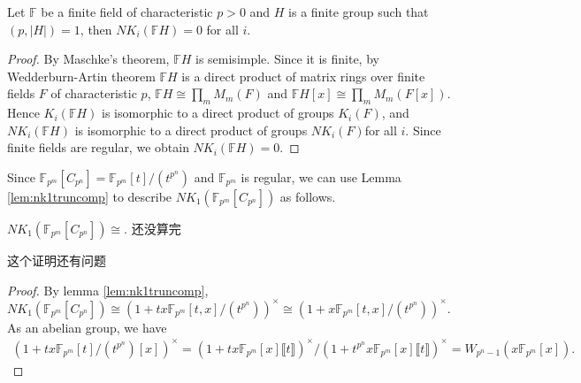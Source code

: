 \begin{theorem}
	Let $\mathbb{F}$ be a finite field of characteristic $p>0$ and $H$ is a finite group such that $(p, |H|)=1$, then $NK_i(\mathbb{F}H)=0$  for all $i$.
\end{theorem}
\begin{proof}
	By Maschke's theorem, $\mathbb{F}H$ is semisimple. Since it is finite, by Wedderburn-Artin theorem $\mathbb{F}H$ is a direct product of matrix rings over finite fields $F$ of characteristic $p$, $\mathbb{F}H \cong \prod_m M_m(F)$ and 
	$\mathbb{F}H[x] \cong \prod_m M_m(F[x])$. Hence $K_i(\mathbb{F}H)$ is isomorphic to a direct product of groups $K_i(F)$, and $NK_i(\mathbb{F}H)$ is isomorphic to a direct product of groups $NK_i(F)$for all $i$. Since finite fields are regular, we obtain $NK_i(\mathbb{F}H)=0$.
\end{proof}




Since $\mathbb{F}_{p^m}[C_{p^n}]=\mathbb{F}_{p^m}[t]/(t^{p^n})$ and $\mathbb{F}_{p^m}$ is regular, we can use Lemma \ref{lem:nk1truncomp} to describe $NK_1(\mathbb{F}_{p^m}[C_{p^n}])$ as follows.
\begin{theorem}
	$NK_1(\mathbb{F}_{p^m}[C_{p^n}])\cong $. 还没算完 %
\end{theorem}
{\color{red} 这个证明还有问题

\begin{proof}
	By lemma \ref{lem:nk1truncomp}, $NK_1(\mathbb{F}_{p^m}[C_{p^n}])\cong  (1+tx\mathbb{F}_{p^m}[t,x]/(t^{p^n}))^{\times}\cong  (1+x\mathbb{F}_{p^m}[t,x]/(t^{p^n}))^{\times}$. As an abelian group, we have
		\begin{align*}
			(1+tx\mathbb{F}_{p^m}[t]/(t^{p^n})[x])^{\times}=  (1+tx\mathbb{F}_{p^m}[x]\llbracket t\rrbracket )^{\times}/(1+t^{p^n}x\mathbb{F}_{p^m}[x]\llbracket t\rrbracket )^{\times} = W_{p^n-1}(x\mathbb{F}_{p^m}[x]).
		\end{align*}

\end{proof}}




